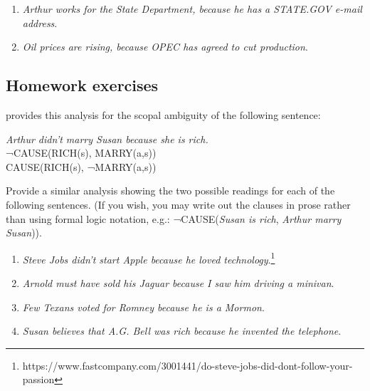 \begin{enumerate}
\item 
\textit{Arthur works for the State Department, because he has a STATE.GOV e-mail address}.
\item 
\textit{Oil prices are rising, because OPEC has agreed to cut production}.
\end{enumerate}
\subsection*{Homework exercises}\label{sec:}

 provides this analysis for the scopal ambiguity of the following sentence:

\ea
  \textit{Arthur didn’t marry Susan because she is rich.}\\
\ea ¬CAUSE(RICH(s), MARRY(a,s))\\
\ex CAUSE(RICH(s), ¬MARRY(a,s))
\z \z

Provide a similar analysis showing the two possible readings for each of the following sentences. (If you wish, you may write out the clauses in prose rather than using formal logic notation, e.g.: ¬CAUSE(\textit{Susan is rich}, \textit{Arthur marry Susan})).

\begin{enumerate}
\item \textit{Steve Jobs didn’t start Apple because he loved technology}.\footnote{https://www.fastcompany.com/3001441/do-steve-jobs-did-dont-follow-your-passion}
\item \textit{Arnold must have sold his Jaguar because I saw him driving a minivan}.
\item \textit{Few Texans voted for Romney because he is a Mormon}.
\item \textit{Susan believes that A.G. Bell was rich because he invented the telephone}.
\end{enumerate}

